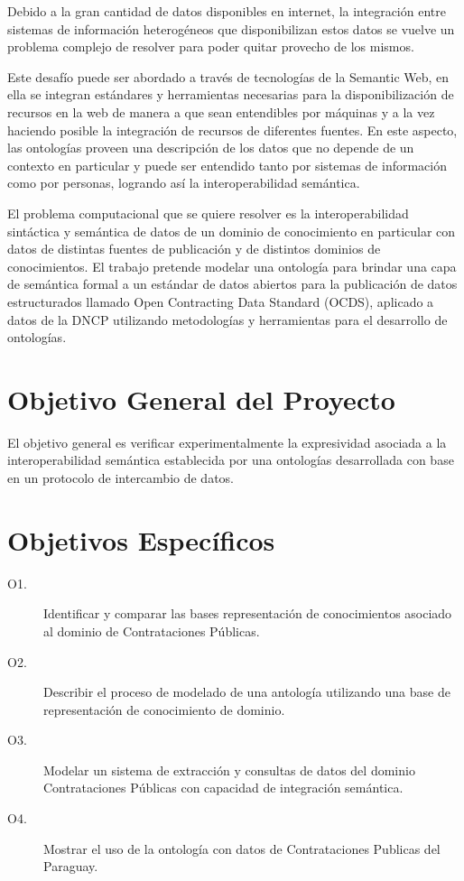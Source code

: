 Debido a la gran cantidad de datos disponibles en internet, la integración entre sistemas de información heterogéneos que disponibilizan estos datos se vuelve un problema complejo de resolver para poder quitar provecho de los mismos. 

Este desafío puede ser abordado a través de tecnologías de la Semantic Web, en ella se integran estándares y herramientas necesarias para la disponibilización de recursos en la web de manera a que sean entendibles por máquinas y a la vez haciendo posible la integración de recursos de diferentes fuentes. En este aspecto, las ontologías proveen una descripción de los datos que no depende de un contexto en particular y puede ser entendido tanto por sistemas de información como por personas, logrando así la interoperabilidad semántica.

El problema computacional que se quiere resolver es la interoperabilidad sintáctica y semántica de datos de un dominio de conocimiento en particular con datos de distintas fuentes de publicación y de distintos dominios de conocimientos. El trabajo pretende modelar una ontología para brindar una capa de semántica formal a un estándar de datos abiertos para la publicación de datos estructurados llamado Open Contracting Data Standard (OCDS), aplicado a datos de la DNCP utilizando metodologías y herramientas para el desarrollo de ontologías. 


\section{Objetivo General del Proyecto}

El objetivo general es verificar experimentalmente la expresividad asociada a la interoperabilidad semántica establecida por una ontologías desarrollada con base en un protocolo de intercambio de datos.


\section{Objetivos Específicos}
\label{objetivos especiicos}


\begin{description}
    \item[O1.] Identificar y comparar las bases representación de conocimientos asociado al dominio de Contrataciones Públicas.
    \item[O2.] Describir el proceso de modelado de una antología utilizando una base de representación de conocimiento de dominio.
    \item[O3.] Modelar un sistema de extracción y consultas de datos del dominio Contrataciones Públicas con capacidad de integración semántica.
    \item[O4.] Mostrar el uso de la ontología con datos de Contrataciones Publicas del Paraguay.
\end{description} 


